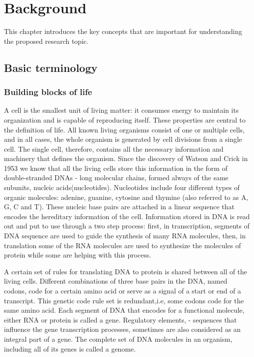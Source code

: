 \documentclass[11pt, a4paper,oneside]{report}
\newcommand{\mychapter}[2]{
    \setcounter{chapter}{#1}
    \setcounter{section}{0}
    \chapter*{#2}
    \addcontentsline{toc}{chapter}{#2}
}
\begin{document}
\mychapter{1}{Background}

This chapter introduces the key concepts that are important for understanding the proposed research topic. 
\section{Basic terminology}
\subsection{Building blocks of life}
A cell is the smallest unit of living matter: it consumes energy to maintain its organization and is capable of reproducing itself. These properties are central to the definition of life. All known living organisms consist of one or multiple cells, and in all cases, the whole organism is generated by cell divisions from a single cell. The single cell, therefore, contains all the necessary information and machinery that defines the organism.  Since the discovery of Watson and Crick in 1953\cite{Watson1974} we know that all the living cells store this information in the form of double-stranded DNAs -  long molecular chains, formed always of the same subunits, nucleic acids(nucleotides). Nucleotides include four different types of organic molecules: adenine, guanine, cytosine and thymine (also referred to as A, G, C and T). These nucleic base pairs are attached  in a linear sequence that encodes the hereditary information of the cell. Information stored in DNA is read out and put to use through a two step process: first, in transcription, segments of DNA sequence are used to guide the synthesis of many RNA molecules, then, in translation some of the RNA molecules are used to synthesize the molecules of protein while some are helping with this process\cite{britannica}.

 A certain set of rules for translating DNA to protein is shared between all of the living cells.  Different combinations of three base pairs in the DNA, named codons, code for a certain amino acid or serve as a signal of a start or end of a transcript. This genetic code rule set is redundant,i.e, some codons code for the same amino acid\cite{Turanov2009}. Each segment of DNA that encodes for a functional molecule, either RNA or protein is called a gene\cite{Gerstein2007}. Regulatory elements, - sequences that influence the gene transcription processes, sometimes are also considered as an integral part of a gene.\cite{lodish2001} The complete set of DNA molecules in an organism, including all of its genes is called a genome.  
 
\end{document}
